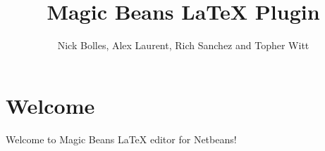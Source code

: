 \documentclass[12pt]{article}
\title{Magic Beans \LaTeX{} Plugin}
\date{}
\author{Nick Bolles, Alex Laurent, Rich Sanchez and Topher Witt}
\begin{document}
  \maketitle
  \section{Welcome}
  Welcome to Magic Beans \LaTeX{} editor for Netbeans!
\end{document}
